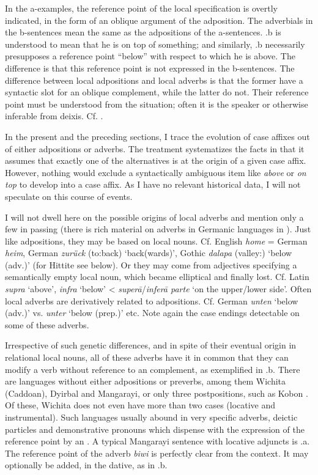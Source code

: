 \noindent In the a-examples, the reference point of the local specification is overtly indicated, in the form of an oblique argument of the adposition. The adverbials in the b-sentences mean the same as the adpositions of the a-sentences. .b is understood to mean that he is on top of something; and similarly, .b necessarily presupposes a reference point “below” with respect to which he is above. The difference is that this reference point is not expressed in the b-sentences. The difference between local adpositions and local adverbs is that the former have a syntactic slot for an oblique complement, while the latter do not. Their reference point must be understood from the situation; often it is the speaker or otherwise inferable from deixis. Cf. \citet[150f]{Matthews1981}.

In the present and the preceding sections, I trace the evolution of case affixes out of either adpositions or adverbs. The treatment systematizes the facts in that it assumes that exactly one of the alternatives is at the origin of a given case affix. However, nothing would exclude a syntactically ambiguous item like \textit{above} or \textit{on top} to develop into a case affix. As I have no relevant historical data, I will not speculate on this course of events.

I will not dwell here on the possible origins of local adverbs and mention only a few in passing (there is rich material on adverbs in Germanic languages in \citealt[173--175]{Ramat1980}). Just like adpositions, they may be based on local nouns. Cf. English \textit{home} = German \textit{heim}, German \textit{zurück} (to:back) ‘back(wards)’, Gothic \textit{dalapa} (valley:\glloc) ‘below (adv.)’ (for Hittite see below). Or they may come from adjectives specifying a semantically empty local noun, which became elliptical and finally lost. Cf. Latin \textit{supra} ‘above’, \textit{infra} ‘below’ {\textless} \textit{super\=a}/\textit{infer\=a parte} ‘on the upper/lower side’. Often local adverbs are derivatively related to adpositions. Cf. German \textit{unten} ‘below (adv.)’ vs. \textit{unter} ‘below (prep.)’ etc. Note again the case endings detectable on some of these adverbs.

Irrespective of such genetic differences, and in spite of their eventual origin in relational local nouns, all of these adverbs have it in common that they can modify a verb without reference to an \np complement, as exemplified in .b. There are languages without either adpositions or preverbs, among them Wichita (Caddoan), Dyirbal and Mangarayi, or only three postpositions, such as Kobon \citep[205f]{Davies1981}. Of these, Wichita does not even have more than two cases (locative and instrumental). Such languages usually abound in very specific adverbs, deictic particles and demonstrative pronouns which dispense with the expression of the reference point by an \np. A typical Mangarayi sentence with locative adjuncts is .a. The reference point of the adverb \textit{biwi} is perfectly clear from the context. It may optionally be added, in the dative, as in .b.

